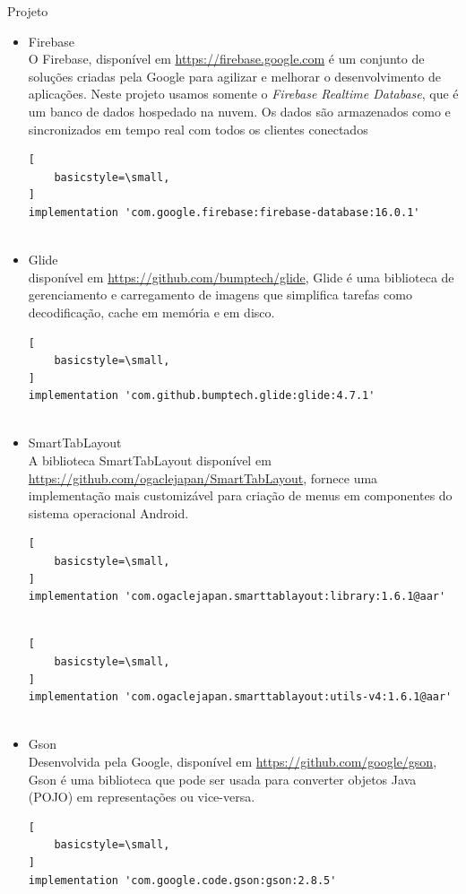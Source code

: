 \documentclass[
	12pt,				%
	openany,			%
	twoside,			%
	a4paper,			%
	english,			%
	french,				%
	spanish,			%
	brazil				%
	]{abntex2}
\begin{document}
\begin{chapter}{Projeto}
\begin{itemize}
\begin{lstlisting}[
    basicstyle=\small,
]
\end{lstlisting}
\item{Firebase} \\
O Firebase, disponível em \url{https://firebase.google.com} é um conjunto de soluções criadas pela Google para agilizar e melhorar o desenvolvimento de aplicações. Neste projeto usamos somente o \textit{Firebase Realtime Database}, que é um banco de dados hospedado na nuvem. Os dados são armazenados como  e sincronizados em tempo real com todos os clientes conectados
        \begin{lstlisting}[
    basicstyle=\small,
]
implementation 'com.google.firebase:firebase-database:16.0.1'
  
\end{lstlisting}
\item{Glide} \\
   disponível em \url{https://github.com/bumptech/glide}, Glide é uma biblioteca de gerenciamento e carregamento de imagens 
que simplifica tarefas como decodificação, cache em memória e em disco. 
        \begin{lstlisting}[
    basicstyle=\small,
]
implementation 'com.github.bumptech.glide:glide:4.7.1'
  
\end{lstlisting}
\item{SmartTabLayout} \\
 A biblioteca SmartTabLayout disponível em \url{https://github.com/ogaclejapan/SmartTabLayout}, fornece uma implementação mais customizável 
para criação de menus em componentes do sistema operacional Android.
         \begin{lstlisting}[
    basicstyle=\small,
]
implementation 'com.ogaclejapan.smarttablayout:library:1.6.1@aar'
   
\end{lstlisting}
        \begin{lstlisting}[
    basicstyle=\small,
]
implementation 'com.ogaclejapan.smarttablayout:utils-v4:1.6.1@aar'
   
\end{lstlisting}
\item{Gson} \\
   Desenvolvida pela Google, disponível em \url{https://github.com/google/gson}, Gson é uma biblioteca que pode ser usada para converter objetos Java (POJO) em representações  ou vice-versa.
         \begin{lstlisting}[
    basicstyle=\small,
]
implementation 'com.google.code.gson:gson:2.8.5'
    

\end{lstlisting}
\end{itemize}
\end{chapter}
\end{document}
